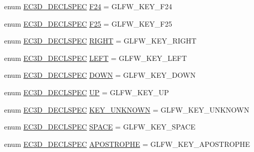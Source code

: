 \begin{DoxyCompactItemize}
\item 
enum \mbox{\hyperlink{_common_8h_aac42573e202ca3dd4d259c81691e2369}{E\+C3\+D\+\_\+\+D\+E\+C\+L\+S\+P\+EC}} \mbox{\hyperlink{classec_1_1_keyboard_af709a6fa5ab3d0e5069cf29f3f9861d3}{F24}} = G\+L\+F\+W\+\_\+\+K\+E\+Y\+\_\+\+F24
\item 
enum \mbox{\hyperlink{_common_8h_aac42573e202ca3dd4d259c81691e2369}{E\+C3\+D\+\_\+\+D\+E\+C\+L\+S\+P\+EC}} \mbox{\hyperlink{classec_1_1_keyboard_a00ab8cfc0de951d98d759ddc214e2523}{F25}} = G\+L\+F\+W\+\_\+\+K\+E\+Y\+\_\+\+F25
\item 
enum \mbox{\hyperlink{_common_8h_aac42573e202ca3dd4d259c81691e2369}{E\+C3\+D\+\_\+\+D\+E\+C\+L\+S\+P\+EC}} \mbox{\hyperlink{classec_1_1_keyboard_a93964921f5a24fd48633e2248d67499c}{R\+I\+G\+HT}} = G\+L\+F\+W\+\_\+\+K\+E\+Y\+\_\+\+R\+I\+G\+HT
\item 
enum \mbox{\hyperlink{_common_8h_aac42573e202ca3dd4d259c81691e2369}{E\+C3\+D\+\_\+\+D\+E\+C\+L\+S\+P\+EC}} \mbox{\hyperlink{classec_1_1_keyboard_a08f676328855059e8687a4d7b52302b4}{L\+E\+FT}} = G\+L\+F\+W\+\_\+\+K\+E\+Y\+\_\+\+L\+E\+FT
\item 
enum \mbox{\hyperlink{_common_8h_aac42573e202ca3dd4d259c81691e2369}{E\+C3\+D\+\_\+\+D\+E\+C\+L\+S\+P\+EC}} \mbox{\hyperlink{classec_1_1_keyboard_a9ce6be84370e9da9eab27348d9f98b5a}{D\+O\+WN}} = G\+L\+F\+W\+\_\+\+K\+E\+Y\+\_\+\+D\+O\+WN
\item 
enum \mbox{\hyperlink{_common_8h_aac42573e202ca3dd4d259c81691e2369}{E\+C3\+D\+\_\+\+D\+E\+C\+L\+S\+P\+EC}} \mbox{\hyperlink{classec_1_1_keyboard_a6da2eed1074dc9feaf4b68ab3da684d8}{UP}} = G\+L\+F\+W\+\_\+\+K\+E\+Y\+\_\+\+UP
\item 
enum \mbox{\hyperlink{_common_8h_aac42573e202ca3dd4d259c81691e2369}{E\+C3\+D\+\_\+\+D\+E\+C\+L\+S\+P\+EC}} \mbox{\hyperlink{classec_1_1_keyboard_aaa582392dbeacf392632aafcdb451721}{K\+E\+Y\+\_\+\+U\+N\+K\+N\+O\+WN}} = G\+L\+F\+W\+\_\+\+K\+E\+Y\+\_\+\+U\+N\+K\+N\+O\+WN
\item 
enum \mbox{\hyperlink{_common_8h_aac42573e202ca3dd4d259c81691e2369}{E\+C3\+D\+\_\+\+D\+E\+C\+L\+S\+P\+EC}} \mbox{\hyperlink{classec_1_1_keyboard_a747605ff6ca24b347a35e4e5a71edbe9}{S\+P\+A\+CE}} = G\+L\+F\+W\+\_\+\+K\+E\+Y\+\_\+\+S\+P\+A\+CE
\item 
enum \mbox{\hyperlink{_common_8h_aac42573e202ca3dd4d259c81691e2369}{E\+C3\+D\+\_\+\+D\+E\+C\+L\+S\+P\+EC}} \mbox{\hyperlink{classec_1_1_keyboard_a56f1ecab0667ad8538826049157c4351}{A\+P\+O\+S\+T\+R\+O\+P\+HE}} = G\+L\+F\+W\+\_\+\+K\+E\+Y\+\_\+\+A\+P\+O\+S\+T\+R\+O\+P\+HE
\item 

\end{DoxyCompactItemize}
